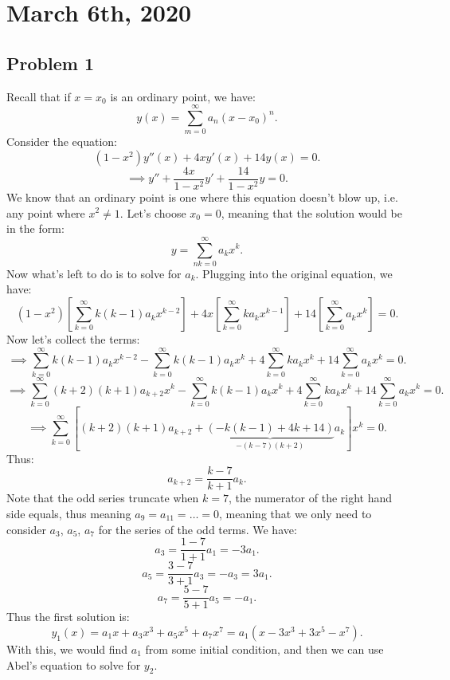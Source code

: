 \documentclass[../main/main.tex]{subfiles}
\begin{document}
\section{March  6th, 2020}
\subsection{Problem 1}
Recall that if $x=x_0$ is an ordinary point, we have: \[
	y(x) = \sum_{m=0}^{\infty} a_n (x-x_0)^{n}
.\] Consider the equation: \[
(1-x^2)y''(x) + 4xy'(x) + 14y(x)= 0
.\] \[
\implies y'' + \frac{4x}{1-x^2}y' + \frac{14}{1-x^2}y = 0
.\] We know that an ordinary point is one where this equation doesn't blow up, i.e. any point where $x^2\neq 1$. Let's choose $x_0=0$, meaning that the solution would be in the form: \[
y = \sum_{nk=0}^{\infty} a_k x^{k}
.\] Now what's left to do is to solve for $a_k$. Plugging into the original equation, we have: \[
(1-x^2) \left[\sum_{k=0}^{\infty} k(k-1)a_kx^{k-2}\right]+4x\left[\sum_{k=0}^{\infty} ka_k x^{k-1}\right] + 14 \left[\sum_{k=0}^{\infty} a_k x^{k}\right] = 0
.\] Now let's collect the terms: \[
\implies\sum_{k=0}^{\infty} k(k-1)a_kx^{k-2}-\sum_{k=0}^{\infty} k(k-1)a_kx^{k}+4\sum_{k=0}^{\infty} ka_k x^{k} + 14 \sum_{k=0}^{\infty} a_k x^{k}= 0 
.\]\[ 
\implies\sum_{k=0}^{\infty} (k+2)(k+1)a_{k+2}x^{k}-\sum_{k=0}^{\infty} k(k-1)a_kx^{k}+4\sum_{k=0}^{\infty} ka_k x^{k} + 14 \sum_{k=0}^{\infty} a_k x^{k}= 0 
.\]  \[ 
\implies\sum_{k=0}^{\infty}\left[ (k+2)(k+1)a_{k+2}+\underbrace{\left( -k(k-1)+4k+14 \right)}_{-(k-7)(k+2)}a_{k}   \right] x^{k}=0
.\]Thus: \[
a_{k+2} = \frac{k-7}{k+1}a_{k}
.\] Note that the odd series truncate when $k=7$, the numerator of the right hand side equals, thus meaning $a_9=a_{11}=\ldots=0$, meaning that we only need to consider $a_3$, $a_5$, $a_7$ for the series of the odd terms. We have: \[
a_{3} = \frac{1-7}{1+1}a_1 = -3a_1
.\] \[
a_5 = \frac{3-7}{3+1}a_3 = -a_3 = 3a_1
.\] \[
a_7 = \frac{5-7}{5+1}a_5 = -a_1
.\] Thus the first solution is: \[
y_1(x) = a_1x + a_3 x^{3}+a_5 x^{5}+a_7x^{7}=a_1\left( x-3x^{3}+3x^{5}-x^{7} \right) 
.\] With this, we would find $a_1$ from some initial condition, and then we can use Abel's equation to solve for $y_2$.
\end{document}
